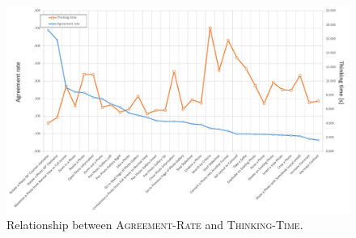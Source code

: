 \begin{figure}
	\centering
	\captionsetup{justification=centering}
	\includegraphics[width=\linewidth]{Figures/App-LUIGES/thinking-time.pdf}
	\caption{Relationship between \textsc{Agreement-Rate} and \textsc{Thinking-Time}.}
	\label{fig:thinking-time}
\end{figure}




